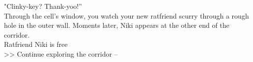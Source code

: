 "Clinky-key? Thank-yoo!”\\

Through the cell’s window, you watch your new ratfriend scurry through a rough hole in the outer wall. Moments later, Niki appears at the other end of the corridor.\\

 Ratfriend Niki is free\\
>> Continue exploring the corridor -- 